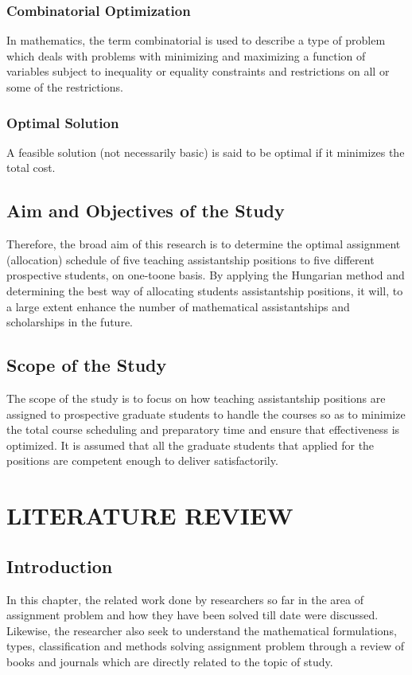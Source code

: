 \documentclass[11pt]{report}
\begin{document}
	\subsection{Combinatorial Optimization}
	In mathematics, the term combinatorial is used to describe a type of problem which deals with problems with minimizing and maximizing a function of variables subject to inequality or equality constraints and restrictions on all or some of the restrictions.
	
	\subsection{Optimal Solution}
	A feasible solution (not necessarily basic) is said to be optimal if it minimizes
	the total cost.
	
	\section{Aim and Objectives of the Study}
	Therefore, the broad aim of this research is to determine the optimal assignment (allocation) schedule of five teaching assistantship positions to five different prospective students, on one-toone basis. By applying the Hungarian method and determining the best way of allocating students assistantship positions, it will, to a large extent enhance the number of mathematical assistantships and scholarships in the future.
	
	\section{Scope of the Study}
	The scope of the study is to focus on how teaching assistantship positions are assigned to prospective graduate students to handle the courses so as to minimize the total course scheduling and preparatory time and ensure that effectiveness is optimized. It is assumed that all the graduate students that applied for the positions are competent enough to deliver satisfactorily.
	
		
	\chapter{LITERATURE REVIEW}
	\section{Introduction}
	In this chapter, the related work done by researchers so far in the area of assignment problem and how they have been solved till date were discussed. Likewise, the researcher also seek to understand the mathematical formulations, types, classification and methods solving assignment problem through a review of books and journals which are directly related to the topic of study.
	
\end{document}
